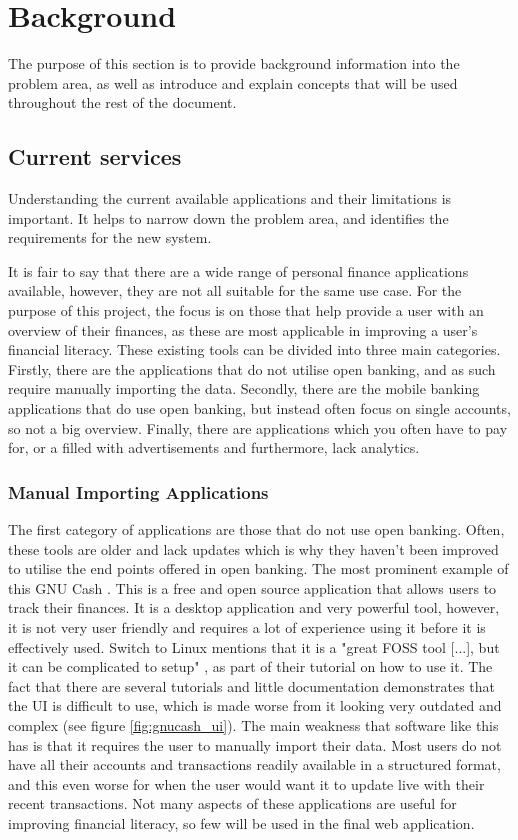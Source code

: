 \chapter{Background}
\label{ch:background}

The purpose of this section is to provide background information into the problem area, as well as introduce and explain concepts that will be used throughout the rest of the document.

\section{Current services}
\label{sec:current-services}
Understanding the current available applications and their limitations is important. It helps to narrow down the problem area, and identifies the requirements for the new system.

It is fair to say that there are a wide range of personal finance applications available, however, they are not all suitable for the same use case. For the purpose of this project, the focus is on those that help provide a user with an overview of their finances, as these are most applicable in improving a user's financial literacy. These existing tools can be divided into three main categories. Firstly, there are the applications that do not utilise open banking, and as such require manually importing the data. Secondly, there are the mobile banking applications that do use open banking, but instead often focus on single accounts, so not a big overview. Finally, there are applications which you often have to pay for, or a filled with advertisements and furthermore, lack analytics.

\subsection{Manual Importing Applications}
\label{sec:manual-importing-applications}
The first category of applications are those that do not use open banking. Often, these tools are older and lack updates which is why they haven't been improved to utilise the end points offered in open banking. The most prominent example of this GNU Cash \cite{GNUCash}. This is a free and open source application that allows users to track their finances. It is a desktop application and very powerful tool, however, it is not very user friendly and requires a lot of experience using it before it is effectively used. Switch to Linux mentions that it is a "great FOSS tool [...], but it can be complicated to setup" \cite{GNUCashSwitchedToLinux}, as part of their tutorial on how to use it. The fact that there are several tutorials and little documentation demonstrates that the UI is difficult to use, which is made worse from it looking very outdated and complex (see figure \ref{fig:gnucash_ui}). The main weakness that software like this has is that it requires the user to manually import their data. Most users do not have all their accounts and transactions readily available in a structured format, and this even worse for when the user would want it to update live with their recent transactions. Not many aspects of these applications are useful for improving financial literacy, so few will be used in the final web application.

